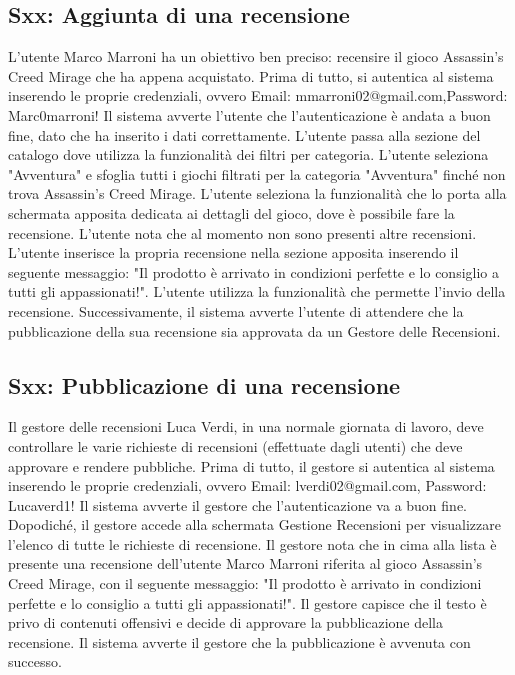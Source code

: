 \documentclass[12pt, a4paper, oneside]{book}
\begin{document}
    \subsection*{Sxx: Aggiunta di una recensione}
    L'utente Marco Marroni ha un obiettivo ben preciso: recensire il gioco Assassin's Creed Mirage che ha appena acquistato.
    Prima di tutto, si autentica al sistema inserendo le proprie credenziali, ovvero Email: mmarroni02@gmail.com,Password: Marc0marroni!
    Il sistema avverte l'utente che l'autenticazione è andata a buon fine, dato che ha inserito i dati correttamente. L'utente passa alla sezione
    del catalogo dove utilizza la funzionalità dei filtri per categoria. L'utente seleziona "Avventura" e sfoglia tutti
    i giochi filtrati per la categoria "Avventura" finché non trova Assassin's Creed Mirage.
    L'utente seleziona la funzionalità che lo porta alla schermata apposita dedicata ai dettagli del gioco,
    dove è possibile fare la recensione. L'utente nota che al momento non sono presenti altre recensioni.
    L'utente inserisce la propria recensione nella sezione apposita inserendo il seguente messaggio: "Il prodotto
    è arrivato in condizioni perfette e lo consiglio a tutti gli appassionati!".
    L'utente utilizza la funzionalità che permette l'invio della recensione. Successivamente, il sistema avverte l'utente
    di attendere che la pubblicazione della sua recensione sia approvata da un Gestore delle Recensioni.

    \subsection*{Sxx: Pubblicazione di una recensione}
    Il gestore delle recensioni Luca Verdi, in una normale giornata di lavoro, deve controllare le varie richieste
    di recensioni (effettuate dagli utenti) che deve approvare e rendere pubbliche.
    Prima di tutto, il gestore si autentica al sistema inserendo le proprie credenziali, ovvero Email: lverdi02@gmail.com, Password: Lucaverd1!
    Il sistema avverte il gestore che l'autenticazione va a buon fine. Dopodiché, il gestore accede alla schermata
    Gestione Recensioni per visualizzare l'elenco di tutte le richieste di recensione. Il gestore nota che in cima
    alla lista è presente una recensione dell'utente Marco Marroni riferita al gioco Assassin's Creed Mirage,
    con il seguente messaggio: "Il prodotto è arrivato in condizioni perfette e lo consiglio a tutti gli appassionati!".
    Il gestore capisce che il testo è privo di contenuti offensivi e decide di approvare la pubblicazione della recensione.
    Il sistema avverte il gestore che la pubblicazione è avvenuta con successo.
\end{document}
